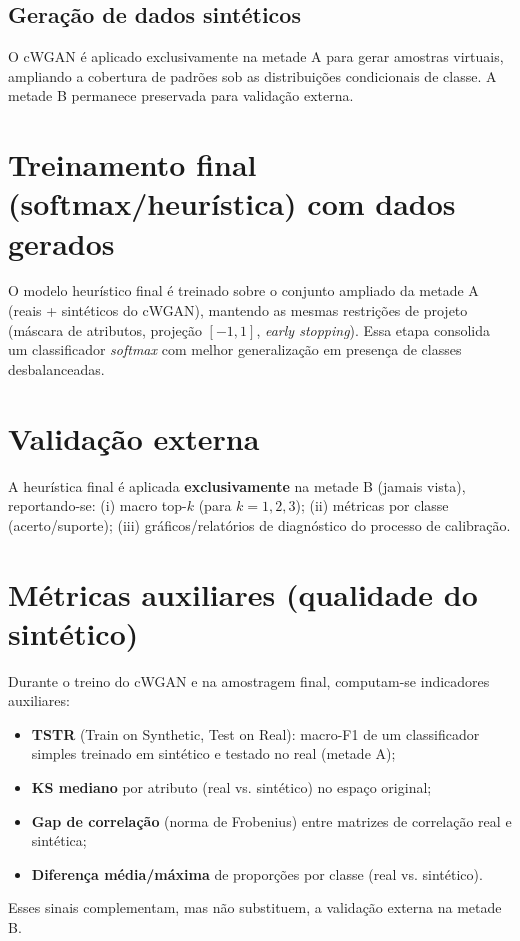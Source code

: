 \documentclass[12pt,a4paper]{article}
\begin{document}
\subsection{Geração de dados sintéticos}
O cWGAN é aplicado exclusivamente na metade A para gerar amostras virtuais, ampliando a cobertura de padrões sob as distribuições condicionais de classe. A metade B permanece preservada para validação externa.

\section{Treinamento final (softmax/heurística) com dados gerados}
O modelo heurístico final é treinado sobre o conjunto ampliado da metade A (reais + sintéticos do cWGAN), mantendo as mesmas restrições de projeto (máscara de atributos, projeção $[-1,1]$, \emph{early stopping}). Essa etapa consolida um classificador \emph{softmax} com melhor generalização em presença de classes desbalanceadas.

\section{Validação externa}
A heurística final é aplicada \textbf{exclusivamente} na metade B (jamais vista), reportando-se: (i) macro top-$k$ (para $k=1,2,3$); (ii) métricas por classe (acerto/suporte); (iii) gráficos/relatórios de diagnóstico do processo de calibração.

\section{Métricas auxiliares (qualidade do sintético)}
Durante o treino do cWGAN e na amostragem final, computam-se indicadores auxiliares:
\begin{itemize}[leftmargin=1.5em]
    \item \textbf{TSTR} (Train on Synthetic, Test on Real): macro-F1 de um classificador simples treinado em sintético e testado no real (metade A);
    \item \textbf{KS mediano} por atributo (real vs. sintético) no espaço original;
    \item \textbf{Gap de correlação} (norma de Frobenius) entre matrizes de correlação real e sintética;
    \item \textbf{Diferença média/máxima} de proporções por classe (real vs. sintético).
\end{itemize}
Esses sinais complementam, mas não substituem, a validação externa na metade B.
\end{document}

